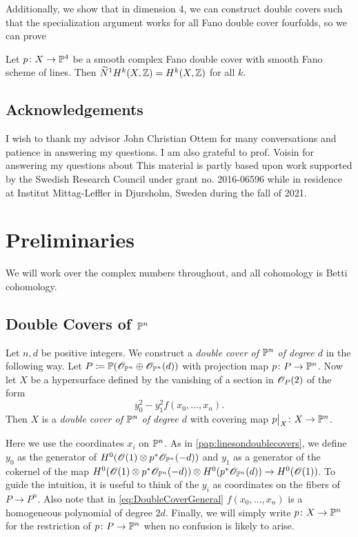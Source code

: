  Additionally, we show that in dimension 4, we can construct double covers such that the specialization argument works for all Fano double cover fourfolds, so we can prove

\begin{theorem}
  \label{thm:IntroductionFourfolds}
  Let $p \from X \to \P^4$ be a smooth complex Fano double cover with smooth Fano scheme of lines. Then $\widetilde{N}^1H^k(X,\Z) = H^k(X,\Z)$ for all $k$.
\end{theorem}


\subsection*{Acknowledgements}
I wish to thank my advisor John Christian Ottem for many conversations and patience in answering my questions. I am also grateful to prof. Voisin for answering my questions about \cite{VoisinConiveauThreefolds} This material is partly based upon work supported by the Swedish Research Council under grant no. 2016-06596 while in residence at Institut Mittag-Leffler in Djursholm, Sweden during the fall of 2021.


\section{Preliminaries}
We will work over the complex numbers throughout, and all cohomology is Betti cohomology.
\subsection{Double Covers of $\P^n$} 
\begin{definition}
	Let $n,d$ be positive integers. We construct a \emph{double cover of $\P^n$ of degree $d$} in the following way. Let $P \coloneqq \P(\sO_{\P^n}\oplus \sO_{\P^n}(d))$ with projection map $p \from P \to \P^n$. Now let $X$ be a hypersurface defined by the vanishing of a section in $\sO_P(2)$ of the form 
	\begin{equation}
		\label{eq:DoubleCoverGeneral}
		y_0^2 - y_1^2f(x_0,\dots,x_n).
	\end{equation}
Then $X$ is a \emph{double cover of $\P^n$ of degree $d$} with covering map $\restr{p}{X} \from X \to \P^n$.
\end{definition}
Here we use the coordinates $x_i$ on $\P^n$. As in \cref{pap:linesondoublecovers}, we define $y_0$ as the generator of $H^0(\sO(1) \otimes p^* \sO_{\P^n}(-d))$ and $y_1$ as a generator of the cokernel of the map $H^0(\sO(1) \otimes p^* \sO_{\P^n}(-d)) \otimes H^0(p^* \sO_{\P^n}(d)) \to H^0(\sO(1))$. To guide the intuition, it is useful to think of the $y_i$ as coordinates on the fibers of $P \to P^n$. Also note that in \eqref{eq:DoubleCoverGeneral} $f(x_0,\dots,x_n)$ is a homogeneous polynomial of degree $2d$. Finally, we will simply write $p \from X \to \P^n$ for the restriction of $p \from P \to \P^n$ when no confusion is likely to arise.

